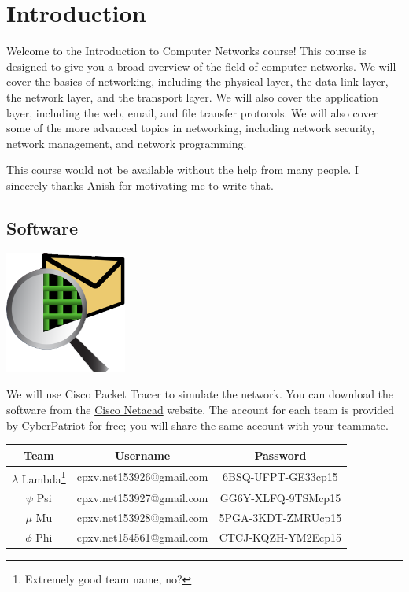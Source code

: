 \section{Introduction}

Welcome to the Introduction to Computer Networks course! This course is
designed to give you a broad overview of the field of computer networks. We
will cover the basics of networking, including the physical layer, the data
link layer, the network layer, and the transport layer. We will also cover the
application layer, including the web, email, and file transfer protocols. We
will also cover some of the more advanced topics in networking, including
network security, network management, and network programming.

This course would not be available without the help from many people. I
sincerely thanks Anish for motivating me to write that.

\subsection{Software}

\begin{center}
    \includegraphics[width=0.3\textwidth]{images/packet_tracer.png}
\end{center}

We will use Cisco Packet Tracer to simulate the network. You can download the
software from the \href{http://www.netacad.com}{Cisco Netacad} website. The
account for each team is provided by CyberPatriot for free; you will share the
same account with your teammate.

\begin{longtable}{ccc}
    \toprule
    Team                                                     & Username                 & Password           \\
    \midrule
    $\lambda$ Lambda\footnote{Extremely good team name, no?} & cpxv.net153926@gmail.com & 6BSQ-UFPT-GE33cp15 \\
    $\psi$ Psi                                               & cpxv.net153927@gmail.com & GG6Y-XLFQ-9TSMcp15 \\
    $\mu$ Mu                                                 & cpxv.net153928@gmail.com & 5PGA-3KDT-ZMRUcp15 \\
    $\phi$ Phi                                               & cpxv.net154561@gmail.com & CTCJ-KQZH-YM2Ecp15 \\
    \bottomrule
\end{longtable}

